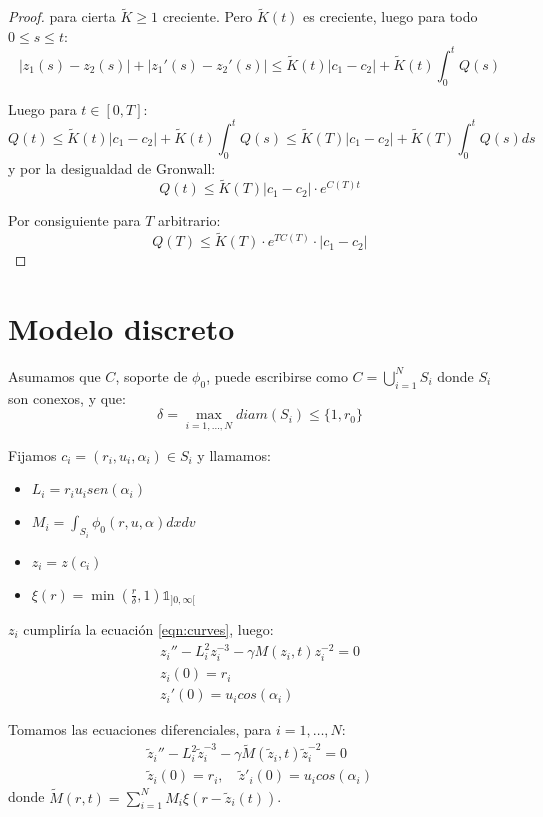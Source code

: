 \documentclass[a4paper,10pt]{scrartcl}
\theoremstyle{definition}
\numberwithin{equation}{section}
\begin{document}
\begin{proof}
 para cierta $\widetilde{K} \ge 1$ creciente. Pero $\widetilde{K}(t)$ es creciente, luego para todo $0 \le s \le t$:
 \[
    |z_1(s) - z_2(s)| + |z_1'(s) - z_2'(s)|  \le \widetilde{K}(t)|c_1 - c_2| + \widetilde{K}(t) \int_0^t Q(s)
 \]

 Luego para $t\in [0,T]$:
 \[
  Q(t) \le \widetilde{K}(t)|c_1 - c_2| + \widetilde{K}(t) \int_0^t Q(s) \le \widetilde{K}(T)|c_1 - c_2| + \widetilde{K}(T) \int_0^t Q(s)ds
 \]
 y por la desigualdad de Gronwall:
 \[
  Q(t) \le \widetilde{K}(T)|c_1 - c_2| \cdot e^{C(T)t}
 \]
 
 Por consiguiente para $T$ arbitrario:
 \[
  Q(T) \le \widetilde{K}(T)\cdot e^{TC(T)} \cdot |c_1 - c_2|
 \]
 
\end{proof}

\section{Modelo discreto}
Asumamos que $C$, soporte de $\phi_0$, puede escribirse como $C= \bigcup_{i=1}^N S_i$ donde $S_i$ son conexos, y que:
\[
    \delta = \max_{i=1,\ldots, N} diam(S_i) \le \{1,r_0\}
\]

Fijamos $c_i = (r_i, u_i, \alpha_i) \in S_i$ y llamamos:
\begin{itemize}
\item $L_i = r_i u_i sen(\alpha_i)$
\item $M_i = \int_{S_i} \phi_0(r,u,\alpha) dxdv$
\item $z_i = z(c_i)$
\item $\xi(r) = \min\left(\frac{r}{\delta},1\right) \mathds{1}_{]0,\infty[}$
\end{itemize}

$z_i$ cumpliría la ecuación \eqref{eqn:curves}, luego:
\begin{align*}
 z_i'' - L_i^2 z_i^{-3} - \gamma M(z_i, t) z_i^{-2} = 0\\
 z_i(0) = r_i\\
 z_i'(0) = u_i cos(\alpha_i)
\end{align*}

Tomamos las ecuaciones diferenciales, para $i=1, \ldots, N$:
\begin{align}
 \label{eqn:approx-curves}
 \widetilde{z}_i'' - L_i^{2} \widetilde{z}_i^{-3} - \gamma \widetilde{M}(\widetilde{z}_i, t) \widetilde{z}_i^{-2} = 0\\
 \widetilde{z}_i(0) = r_i, \quad \widetilde{z}'_i(0) = u_i cos(\alpha_i) \nonumber
\end{align}
donde $\widetilde{M}(r,t) = \sum_{i=1}^N M_i \xi(r-\widetilde{z}_i(t))$.
\end{document}
